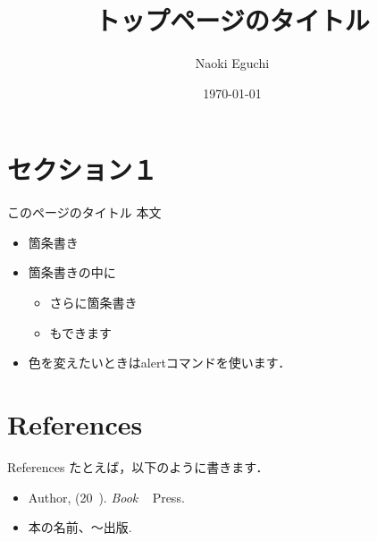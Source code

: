 \documentclass[xcolor=svgnames,aspectratio=169]{beamer}
\newcommand{\1}{\mbox{1}\hspace{-0.25em}\mbox{l}}
\begin{document}
 

\title{トップページのタイトル} 
\author{Naoki Eguchi}          
\date{\today}

\begin{frame}                  
  \titlepage                     
\end{frame}


\section{セクション１}

\begin{frame}{このページのタイトル}
  本文
  \begin{itemize}
    \item 箇条書き
    \item 箇条書きの中に
    \begin{itemize}
      \item さらに箇条書き
      \item もできます
    \end{itemize}
    \item 色を変えたいときは\alert{alert}コマンドを使います．
  \end{itemize}
\end{frame}

\section{References}

\begin{frame}{References}
  たとえば，以下のように書きます．
  \begin{itemize}
    \item Author, (20~). 
          \textit{Book} 
          ~ Press.
    \item 本の名前、〜出版.
  \end{itemize}
\end{frame}
\end{document}
